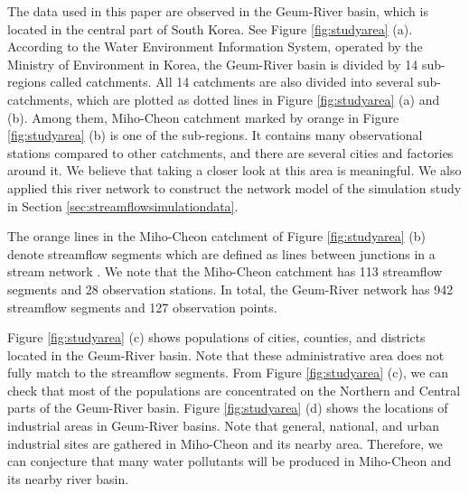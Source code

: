 \documentclass[11pt,titlepage]{article}
\begin{document}
The data used in this paper are observed in the Geum-River basin, which is located in the central part of South Korea. See Figure \ref{fig:studyarea} (a). According to the Water Environment Information System, operated by the Ministry of Environment in Korea, the Geum-River basin is divided by 14 sub-regions called catchments. All 14 catchments are also divided into several sub-catchments, which are plotted as dotted lines in Figure \ref{fig:studyarea} (a) and (b). %
Among them, Miho-Cheon catchment marked by orange in Figure \ref{fig:studyarea} (b) is one of the sub-regions. It contains many observational stations compared to other catchments, and there are several cities and factories around it. We believe that taking a closer look at this area is meaningful. We also applied this river network to construct the network model of the simulation study in Section \ref{sec:streamflowsimulationdata}.

The orange lines in the Miho-Cheon catchment of Figure \ref{fig:studyarea} (b) denote streamflow segments which are defined as lines between junctions in a stream network \citep{VerHoef(2006), VerHoef(2010)}. We note that the Miho-Cheon catchment has 113 streamflow segments and 28 observation stations. %
In total, the Geum-River network has 942 streamflow segments and 127 observation points.

Figure \ref{fig:studyarea} (c) shows populations of cities, counties, and districts located in the Geum-River basin. Note that these administrative area does not fully match to the streamflow segments. From Figure \ref{fig:studyarea} (c), we can check that most of the populations are concentrated on the Northern and Central parts of the Geum-River basin. Figure \ref{fig:studyarea} (d) shows the locations of industrial areas in Geum-River basins. Note that general, national, and urban industrial sites are gathered in Miho-Cheon and its nearby area. Therefore, we can conjecture that many water pollutants will be produced in Miho-Cheon and its nearby river basin.
\end{document}
